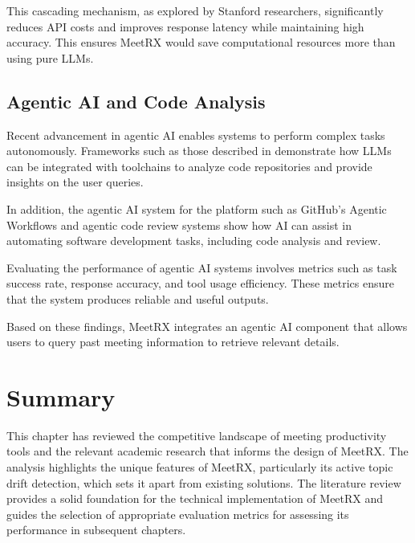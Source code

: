 This cascading mechanism, as explored by Stanford researchers\cite{frugalgpt}, significantly reduces API costs and improves response latency while maintaining high accuracy. This ensures MeetRX would save computational resources more than using pure LLMs.

\subsection{Agentic AI and Code Analysis}
\label{subsection:agentic-ai-code-analysis}

Recent advancement in agentic AI enables systems to perform complex tasks autonomously. Frameworks such as those described in\cite{code_analysis_agent} demonstrate how LLMs can be integrated with toolchains to analyze code repositories and provide insights on the user queries.

In addition, the agentic AI system for the platform such as GitHub's Agentic Workflows\cite{github_agentic} and agentic code review systems\cite{agentic_code_review} show how AI can assist in automating software development tasks, including code analysis and review.

Evaluating the performance of agentic AI systems involves metrics such as task success rate, response accuracy, and tool usage efficiency\cite{agentic_eval}. These metrics ensure that the system produces reliable and useful outputs.

Based on these findings, MeetRX integrates an agentic AI component that allows users to query past meeting information to retrieve relevant details.

\section{Summary}
\label{section:summary}

This chapter has reviewed the competitive landscape of meeting productivity tools and the relevant academic research that informs the design of MeetRX. The analysis highlights the unique features of MeetRX, particularly its active topic drift detection, which sets it apart from existing solutions. The literature review provides a solid foundation for the technical implementation of MeetRX and guides the selection of appropriate evaluation metrics for assessing its performance in subsequent chapters.